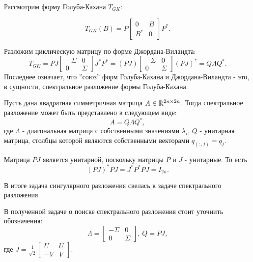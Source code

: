 Рассмотрим  форму Голуба-Кахана \(T_{GK}\):

\begin{equation}
T_{GK} (B) = P \begin{bmatrix} 0 & B \\ B^* & 0 \end{bmatrix} P^* .
\end{equation}

Разложим циклическую матрицу по форме Джордана-Виландта:
\begin{equation}
T_{GK} = P J\begin{bmatrix} -\Sigma & 0 \\ 0 & \Sigma \end{bmatrix}J^* P^* = (PJ) \begin{bmatrix} -\Sigma & 0 \\ 0 & \Sigma \end{bmatrix} (PJ)^*=Q\Lambda Q^*.
\end{equation}
Последнее означает, что ''союз'' форм Голуба-Кахана и Джордана-Виландта - это, в сущности, спектральное разложение формы Голуба-Кахана.

\begin{note}
    Пусть дана квадратная симметричная матрица \(A \in \mathbb{R}^{2n \times 2n}\). 
    Тогда спектральное разложение может быть представлено в следующем виде:
    \[
     A=Q\Lambda Q^*,
    \]
    где \(\Lambda\) - диагональная матрица с собственными значениями \(\lambda_i\), \(Q\) - унитарная матрица, столбцы которой являются собственными векторами \(q_{(:,j)}=q_j\). 
\end{note}

\begin{note}
    Матрица \(PJ\) является унитарной, поскольку матрицы \(P\) и \(J\) - унитарные. То есть 
    \[(PJ)^*PJ=J^* P^* P J=I_{2n}.\]
\end{note}

В итоге задача сингулярного разложения свелась к задаче спектрального разложения. 

\begin{note}
    В полученной задаче о поиске спектрального разложения стоит уточнить обозначения:
    \[
    \Lambda = \begin{bmatrix} -\Sigma & 0 \\ 0 & \Sigma \end{bmatrix}, \ Q= PJ,
    \]
    где \(J= \frac{1}{\sqrt{2}}\begin{bmatrix}
    U & U \\
    -V & V
\end{bmatrix}\).
\end{note}

